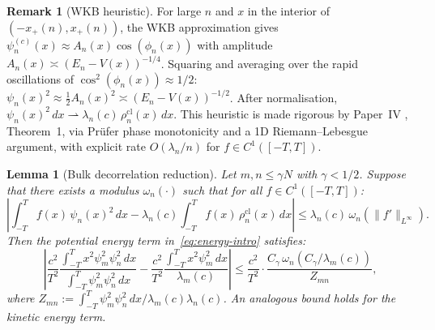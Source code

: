 \documentclass[12pt,a4paper]{amsart}
\newtheorem{lemma}[theorem]{Lemma}
\theoremstyle{definition}
\newtheorem{remark}[theorem]{Remark}
\newcommand{\psin}{\psi_n^{(c)}}
\newcommand{\rhocl}{\rho_n^{\mathrm{cl}}}
\begin{document}
\begin{remark}[WKB heuristic]\label{rem:wkb-heuristic}
For large $n$ and $x$ in the interior of $(-x_+(n),x_+(n))$,
the WKB approximation gives
$\psin(x) \approx A_n(x)\cos(\phi_n(x))$
with amplitude $A_n(x) \asymp (E_n - V(x))^{-1/4}$.
Squaring and averaging over the rapid oscillations of
$\cos^2(\phi_n(x)) \approx 1/2$:
$\psi_n(x)^2 \approx \tfrac{1}{2}A_n(x)^2 \asymp (E_n-V(x))^{-1/2}$.
After normalisation, $\psi_n(x)^2\,dx \rightharpoonup \lambda_n(c)\,\rhocl(x)\,dx$.
This heuristic is made rigorous by Paper~IV \cite{PaperIV},
Theorem~1, via Pr\"{u}fer phase monotonicity and a
1D Riemann--Lebesgue argument, with explicit rate $O(\lambda_n/n)$
for $f \in C^1([-T,T])$.
\end{remark}

\begin{lemma}[Bulk decorrelation reduction]\label{lem:bulk-reduction}
Let $m,n \le \gamma N$ with $\gamma < 1/2$.
Suppose that there exists a modulus $\omega_n(\cdot)$ such that
for all $f \in C^1([-T,T])$:
\begin{equation}\label{eq:weak-conv-hyp}
  \left|
    \int_{-T}^T f(x)\,\psi_n(x)^2\,dx
    - \lambda_n(c)\int_{-T}^T f(x)\,\rhocl(x)\,dx
  \right|
  \le \lambda_n(c)\,\omega_n(\|f'\|_{L^\infty}).
\end{equation}
Then the potential energy term in~\eqref{eq:energy-intro} satisfies:
\begin{equation}\label{eq:B-reduction}
  \left|
    \frac{c^2}{T^2}\frac{\int_{-T}^T x^2\psi_m^2\psi_n^2\,dx}
    {\int_{-T}^T\psi_m^2\psi_n^2\,dx}
    - \frac{c^2}{T^2}\frac{\int_{-T}^T x^2\psi_m^2\,dx}
      {\lambda_m(c)}
  \right|
  \le \frac{c^2}{T^2}\cdot\frac{C_\gamma\,\omega_n(C_\gamma/\lambda_m(c))}
      {Z_{mn}},
\end{equation}
where $Z_{mn} := \int_{-T}^T\psi_m^2\psi_n^2\,dx / \lambda_m(c)\lambda_n(c)$.
An analogous bound holds for the kinetic energy term.
\end{lemma}
\end{document}
